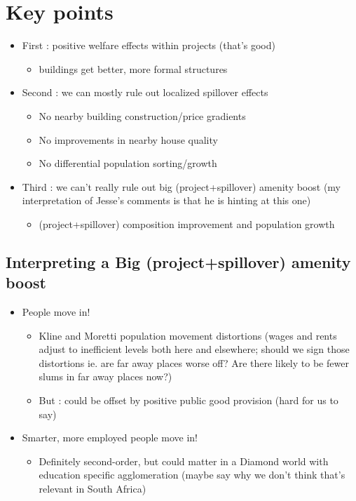 \documentclass[12pt]{article}
\begin{document}
{}

\section*{Key points}

\begin{itemize}
	\item First : positive welfare effects within projects (that's good)
		\begin{itemize}
			\item buildings get better, more formal structures
		\end{itemize}
	\item Second : we can mostly rule out localized spillover effects
		\begin{itemize}
			\item No nearby building construction/price gradients
			\item No improvements in nearby house quality
			\item No differential population sorting/growth
		\end{itemize}
	\item Third : we can't really rule out big (project+spillover) amenity boost (my interpretation of Jesse's comments is that he is hinting at this one)
		\begin{itemize}
			\item (project+spillover) composition improvement and population growth
		\end{itemize}
\end{itemize}

\subsection*{Interpreting a Big (project+spillover) amenity boost}

\begin{itemize}
	\item People move in!
		\begin{itemize}
			\item Kline and Moretti population movement distortions (wages and rents adjust to inefficient levels both here and elsewhere; should we sign those distortions ie. are far away places worse off?  Are there likely to be fewer slums in far away places now?)
			\item But : could be offset by positive public good provision (hard for us to say)
		\end{itemize}
	\item Smarter, more employed people move in!
		\begin{itemize}
			\item Definitely second-order, but could matter in a Diamond world with education specific agglomeration (maybe say why we don't think that's relevant in South Africa)
		\end{itemize}
\end{itemize}
\end{document}
